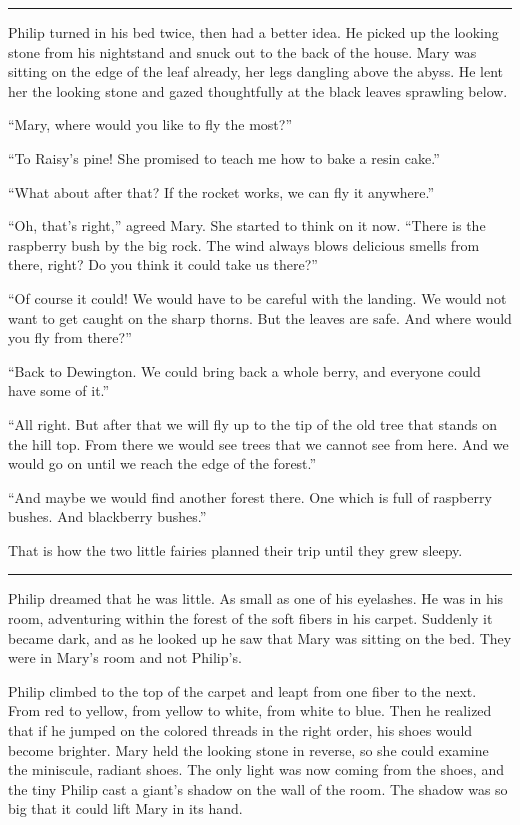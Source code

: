 \documentclass[10pt, draft]{memoir}
\renewcommand{\pfbreakdisplay}{\bigskip \ding{166} \bigskip}
\newcommand{\secbreak}{\fancybreak{\pfbreakdisplay}}
\begin{document}
\secbreak

Philip turned in his bed twice, then had a better idea. He picked up the
looking stone from his nightstand and snuck out to the back of the house. Mary
was sitting on the edge of the leaf already, her legs dangling above the abyss.
He lent her the looking stone and gazed thoughtfully at the black leaves
sprawling below.

``Mary, where would you like to fly the most?''

``To Raisy's pine! She promised to teach me how to bake a resin cake.''

``What about after that? If the rocket works, we can fly it anywhere.''

``Oh, that's right,'' agreed Mary. She started to think on it now. ``There is
the raspberry bush by the big rock. The wind always blows delicious smells from
there, right? Do you think it could take us there?''

``Of course it could! We would have to be careful with the landing. We would
not want to get caught on the sharp thorns. But the leaves are safe. And where
would you fly from there?''

``Back to Dewington. We could bring back a whole berry, and everyone could have
some of it.''

``All right. But after that we will fly up to the tip of the old tree that
stands on the hill top. From there we would see trees that we cannot see from
here. And we would go on until we reach the edge of the forest.''

``And maybe we would find another forest there. One which is full of raspberry
bushes. And blackberry bushes.''

That is how the two little fairies planned their trip until they grew sleepy.

\secbreak

Philip dreamed that he was little. As small as one of his eyelashes. He was in
his room, adventuring within the forest of the soft fibers in his carpet.
Suddenly it became dark, and as he looked up he saw that Mary was sitting on
the bed. They were in Mary's room and not Philip's.

Philip climbed to the top of the carpet and leapt from one fiber to the next.
From red to yellow, from yellow to white, from white to blue. Then he realized
that if he jumped on the colored threads in the right order, his shoes would
become brighter. Mary held the looking stone in reverse, so she could examine
the miniscule, radiant shoes. The only light was now coming from the shoes, and
the tiny Philip cast a giant's shadow on the wall of the room. The shadow was
so big that it could lift Mary in its hand.
\end{document}
